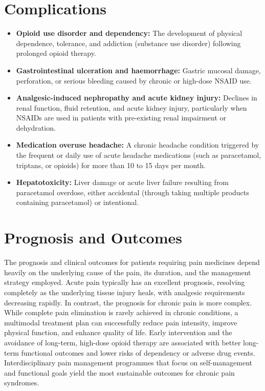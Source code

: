 \section*{Complications}
\begin{itemize}
    \item \textbf{Opioid use disorder and dependency:} The development of physical dependence, tolerance, and addiction (substance use disorder) following prolonged opioid therapy.
    \item \textbf{Gastrointestinal ulceration and haemorrhage:} Gastric mucosal damage, perforation, or serious bleeding caused by chronic or high-dose NSAID use.
    \item \textbf{Analgesic-induced nephropathy and acute kidney injury:} Declines in renal function, fluid retention, and acute kidney injury, particularly when NSAIDs are used in patients with pre-existing renal impairment or dehydration.
    \item \textbf{Medication overuse headache:} A chronic headache condition triggered by the frequent or daily use of acute headache medications (such as paracetamol, triptans, or opioids) for more than 10 to 15 days per month.
    \item \textbf{Hepatotoxicity:} Liver damage or acute liver failure resulting from paracetamol overdose, either accidental (through taking multiple products containing paracetamol) or intentional.
\end{itemize}

\section*{Prognosis and Outcomes}
The prognosis and clinical outcomes for patients requiring pain medicines depend heavily on the underlying cause of the pain, its duration, and the management strategy employed. Acute pain typically has an excellent prognosis, resolving completely as the underlying tissue injury heals, with analgesic requirements decreasing rapidly. In contrast, the prognosis for chronic pain is more complex. While complete pain elimination is rarely achieved in chronic conditions, a multimodal treatment plan can successfully reduce pain intensity, improve physical function, and enhance quality of life. Early intervention and the avoidance of long-term, high-dose opioid therapy are associated with better long-term functional outcomes and lower risks of dependency or adverse drug events. Interdisciplinary pain management programmes that focus on self-management and functional goals yield the most sustainable outcomes for chronic pain syndromes.

